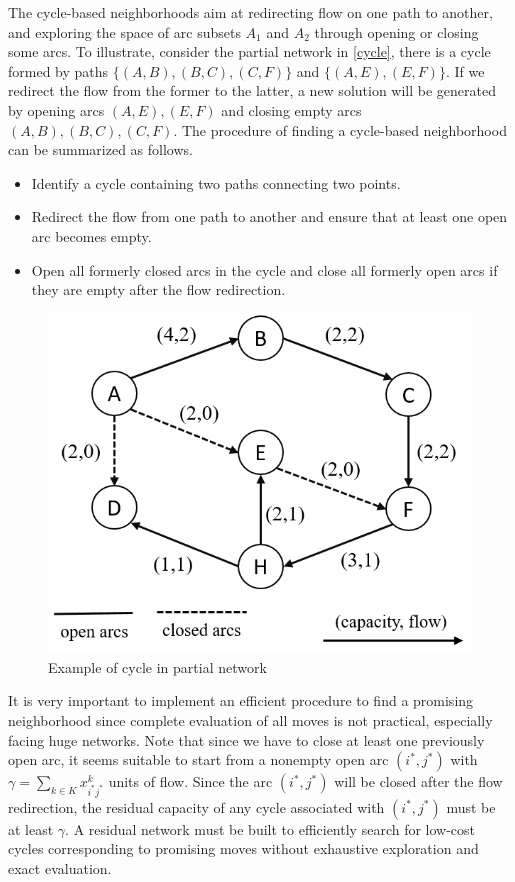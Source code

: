 \documentclass[11pt,nonblindrev,fleqn]{article}
\begin{document}
The cycle-based neighborhoods aim at redirecting flow on one path to another, and exploring the space of arc subsets $A_1$ and $A_2$ through opening or closing some arcs. To illustrate, consider the partial network in \autoref{cycle}, there is a cycle formed by paths $\{ (A,B),(B,C),(C,F) \}$ and $\{ (A,E),(E,F)\}$. If we redirect the flow from the former to the latter, a new solution will be generated by opening arcs $(A,E),(E,F)$ and closing empty arcs $(A,B),(B,C),(C,F)$. The procedure of finding a cycle-based neighborhood can be summarized as follows.
\begin{itemize}
  \item Identify a cycle containing two paths connecting two points.
  \item Redirect the flow from one path to another and ensure that at least one open arc becomes empty.
  \item Open all formerly closed arcs in the cycle and close all formerly open arcs if they are empty after the flow redirection.
\end{itemize}

\begin{figure}[H]
\setlength{\abovecaptionskip}{-5pt}
\setlength{\belowcaptionskip}{-5pt}
\centering
\includegraphics[width=0.5\linewidth]{F2.png}
\caption{Example of cycle in partial network}
\label{cycle}
\end{figure}

It is very important to implement an efficient procedure to find a promising neighborhood since complete evaluation of all moves is not practical, especially facing huge networks. Note that since we have to close at least one previously open arc, it seems suitable to start from a nonempty open arc $(i^*,j^*)$ with $\gamma = \sum_{k\in K} x_{i^*j^*}^k$ units of flow. Since the arc $(i^*,j^*)$ will be closed after the flow redirection, the residual capacity of any cycle associated with $(i^*,j^*)$ must be at least $\gamma$. A residual network must be built to efficiently search for low-cost cycles corresponding to promising moves without exhaustive exploration and exact evaluation.
\end{document}
